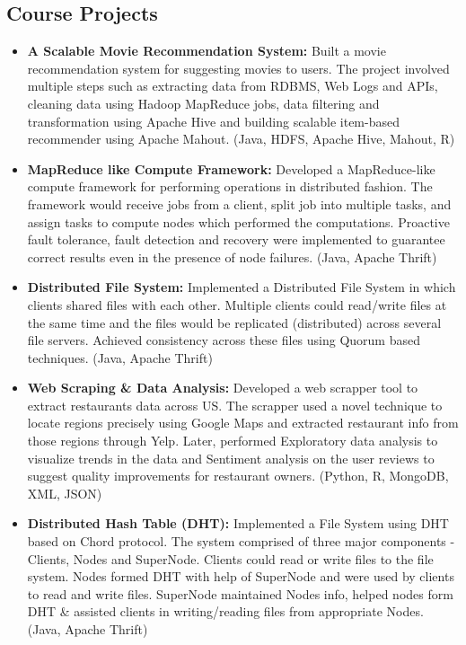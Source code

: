 \documentclass[10pt]{article}
\begin{document}
\subsection*{Course Projects}
\begin{itemize}
\item {\bfseries A Scalable Movie Recommendation System:} Built a movie recommendation system for suggesting movies to users. The project involved multiple steps such as extracting data from RDBMS, Web Logs and APIs, cleaning data using Hadoop MapReduce jobs, data filtering and transformation using Apache Hive and building scalable item-based recommender using Apache Mahout. (Java, HDFS, Apache Hive, Mahout, R)
\item {\bfseries MapReduce like Compute Framework:} Developed a MapReduce-like compute framework for performing operations in distributed fashion. The framework would receive jobs from a client, split job into multiple tasks, and assign tasks to compute nodes which performed the computations. Proactive fault tolerance, fault detection and recovery were implemented to guarantee correct results even in the presence of node failures. (Java, Apache Thrift)
\item {\bfseries Distributed File System:} Implemented a Distributed File System in which clients shared files with each other. Multiple clients could read/write files at the same time and the files would be replicated (distributed) across several file servers. Achieved consistency across these files using Quorum based techniques. (Java, Apache Thrift)
\item {\bfseries Web Scraping \& Data Analysis:} Developed a web scrapper tool to extract restaurants data across US. The scrapper used a novel technique to locate regions precisely using Google Maps and extracted restaurant info from those regions through Yelp. Later, performed Exploratory data analysis to visualize trends in the data and Sentiment analysis on the user reviews to suggest quality improvements for restaurant owners. (Python, R, MongoDB, XML, JSON)
\item {\bfseries Distributed Hash Table (DHT):} Implemented a File System using DHT based on Chord protocol. The system comprised of three major components - Clients, Nodes and SuperNode. Clients could read or write files to the file system. Nodes formed DHT with help of SuperNode and were used by clients to read and write files. SuperNode maintained Nodes info, helped nodes form DHT \& assisted clients in writing/reading files from appropriate Nodes. (Java, Apache Thrift)
\end{itemize}
\vspace{-0.5cm}
\end{document}
